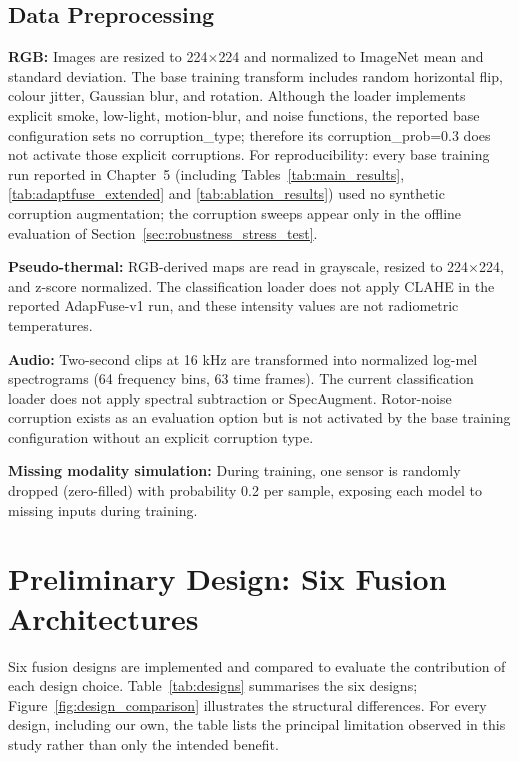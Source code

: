 \subsection{Data Preprocessing}

\textbf{RGB:} Images are resized to 224$\times$224 and normalized to ImageNet mean and standard deviation. The base training transform includes random horizontal flip, colour jitter, Gaussian blur, and rotation. Although the loader implements explicit smoke, low-light, motion-blur, and noise functions, the reported base configuration sets no corruption\_type; therefore its corruption\_prob=0.3 does not activate those explicit corruptions. For reproducibility: every base training run reported in Chapter~5 (including Tables~\ref{tab:main_results}, \ref{tab:adaptfuse_extended} and \ref{tab:ablation_results}) used no synthetic corruption augmentation; the corruption sweeps appear only in the offline evaluation of Section~\ref{sec:robustness_stress_test}.

\textbf{Pseudo-thermal:} RGB-derived maps are read in grayscale, resized to 224$\times$224, and z-score normalized. The classification loader does not apply CLAHE in the reported AdapFuse-v1 run, and these intensity values are not radiometric temperatures.

\textbf{Audio:} Two-second clips at 16 kHz are transformed into normalized log-mel spectrograms (64 frequency bins, 63 time frames). The current classification loader does not apply spectral subtraction or SpecAugment. Rotor-noise corruption exists as an evaluation option but is not activated by the base training configuration without an explicit corruption type.

\textbf{Missing modality simulation:} During training, one sensor is randomly dropped (zero-filled) with probability 0.2 per sample, exposing each model to missing inputs during training.

\section{Preliminary Design: Six Fusion Architectures}

Six fusion designs are implemented and compared to evaluate the contribution of each design choice. Table~\ref{tab:designs} summarises the six designs; Figure~\ref{fig:design_comparison} illustrates the structural differences. For every design, including our own, the table lists the principal limitation observed in this study rather than only the intended benefit.

